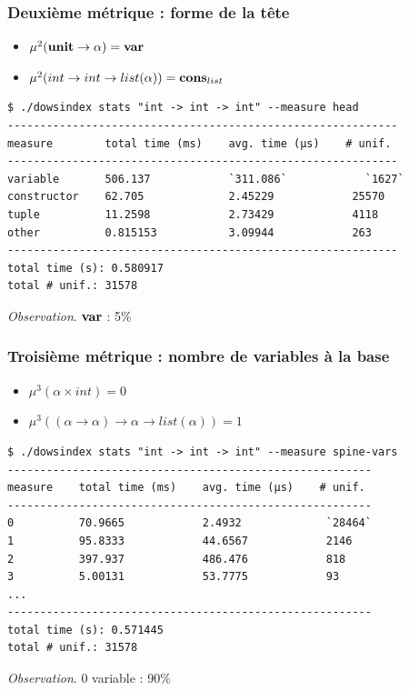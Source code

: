\documentclass[serif]{beamer}
\newcommand{\unit}{\bold{unit}}
\begin{document}
\begin{frame}[fragile=singleslide]\frametitle{Deuxième métrique : forme de la tête}
\scriptsize
\begin{itemize}
	\item $\mu^2 (\unit \rightarrow \alpha) = \bold{var}$
	\item $\mu^2 (int \rightarrow int \rightarrow list (\alpha)) = \bold{cons}_{list}$
\end{itemize}
\begin{lstlisting}
$ ./dowsindex stats "int -> int -> int" --measure head
------------------------------------------------------------
measure        total time (ms)    avg. time (µs)    # unif.
------------------------------------------------------------
variable       506.137            `311.086`            `1627`
constructor    62.705             2.45229            25570
tuple          11.2598            2.73429            4118
other          0.815153           3.09944            263
------------------------------------------------------------
total time (s): 0.580917
total # unif.: 31578
\end{lstlisting}
\textit{Observation}. $\bold{var}$ : 5\%
\end{frame}


\begin{frame}[fragile=singleslide]\frametitle{Troisième métrique : nombre de variables à la base}
\scriptsize
\begin{itemize}
	\item $\mu^3 (\alpha \times int) = 0$
	\item $\mu^3 ((\alpha \rightarrow \alpha) \rightarrow \alpha \rightarrow list (\alpha)) = 1$
\end{itemize}
\begin{lstlisting}
$ ./dowsindex stats "int -> int -> int" --measure spine-vars
--------------------------------------------------------
measure    total time (ms)    avg. time (µs)    # unif.
--------------------------------------------------------
0          70.9665            2.4932             `28464`
1          95.8333            44.6567            2146
2          397.937            486.476            818
3          5.00131            53.7775            93
...
--------------------------------------------------------
total time (s): 0.571445
total # unif.: 31578
\end{lstlisting}
\textit{Observation}. 0 variable : 90\%
\end{frame}
\end{document}
